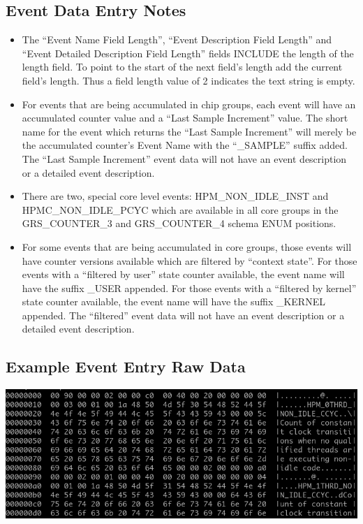 \documentclass[14]{article}
\begin{document}
\subsection{Event Data Entry Notes}
\begin{itemize}
\item The ``Event Name Field Length'', ``Event Description Field Length'' and ``Event
  Detailed Description Field Length'' fields INCLUDE the length of the length
  field. To point to the start of the next field's length add the current
  field's length. Thus a field length value of 2 indicates the text string is
  empty.
\item For events that are being accumulated in chip groups, each event will have
  an accumulated counter value and a ``Last Sample Increment'' value. The short
  name for the event which returns the ``Last Sample Increment'' will merely be
  the accumulated counter's Event Name with the ``\_SAMPLE'' suffix added. The
  ``Last Sample Increment'' event data will not have an event description or a
  detailed event description.
\item There are two, special core level events: HPM\_NON\_IDLE\_INST and
  HPMC\_NON\_IDLE\_PCYC which are available in all core groups in the
  GRS\_COUNTER\_3 and GRS\_COUNTER\_4 schema ENUM positions.
\item For some events that are being accumulated in core groups, those events
  will have counter versions available which are filtered by ``context
  state''. For those events with a ``filtered by user'' state counter available,
  the event name will have the suffix \_USER appended. For those events with a
  ``filtered by kernel'' state counter available, the event name will have the
  suffix \_KERNEL appended. The ``filtered'' event data will not have an event
  description or a detailed event description.
\end{itemize}

\subsection{Example Event Entry Raw Data}
\includegraphics[scale=0.6]{events_raw.png}
\end{document}
